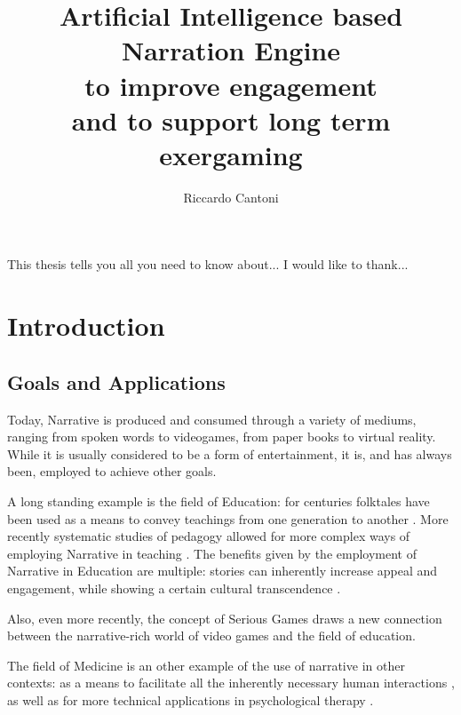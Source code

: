 \documentclass[12pt,a4paper,oneside]{report}
\begin{document}
\title{
Artificial Intelligence based \protect\\
Narration Engine \protect\\ 
to improve engagement \protect\\ 
\vspace{8pt}
and to support long term exergaming}
\author{Riccardo Cantoni}
\beforepreface
{}
This thesis tells you all you need to know about...
I would like to thank...
\afterpreface

\pagebreak

\chapter{Introduction}
\section{Goals and Applications}

Today, Narrative is produced and consumed through a variety of mediums, ranging from spoken words to videogames, from paper books to virtual reality. While it is usually considered to be a form of entertainment, it is, and has always been, employed to achieve other goals.

A long standing example is the field of Education: for centuries folktales have been used as a means to convey teachings from one generation to another \cite{moraltales}. More recently systematic studies of pedagogy allowed for more complex ways of employing Narrative in teaching \cite{pedagogy}.
The benefits given by the employment of Narrative in Education are multiple: stories can inherently increase appeal and engagement, while showing a certain cultural transcendence \cite{narrationlearning}. 

Also, even more recently, the concept of Serious Games draws a new connection between the narrative-rich world of video games and the field of education.

The field of Medicine is an other example of the use of narrative in other contexts: as a means to facilitate all the inherently necessary human interactions \cite{narrativemedicine}, as well as for more technical applications in psychological therapy \cite{psychotherapy}.

\bigskip
\end{document}
